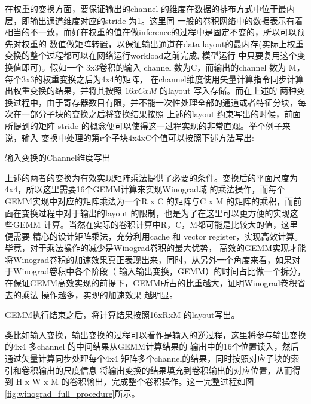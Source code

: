 在权重的变换方面，要保证输出的channel 的维度在数据的排布方式中位于最内层，即输出通道维度对应的stride 为1。这里同
一般的卷积网络中的数据表示有着相当的不一致，而好在权重的值在做inference的过程中是固定不变的，所以可以预先对权重的
数值做矩阵转置，以保证输出通道在data layout的最内存(实际上权重变换的整个过程都可以在网络运行workload之前完成, 模型运行
中只要复用这个变换值即可)。假如一个 3x3卷积的输入 channel 数为C，而输出的channel 数为 M，每个3x3的权重变换之后为4x4的矩阵，
在channel维度使用矢量计算指令同步计算出权重变换的结果，并将其按照 $ 16 x C x M $ 的layout 写入存储。而在上述的
两种变换过程中，由于寄存器数目有限，并不能一次性处理全部的通道或者特征分块，每次在一部分子块的变换之后将变换结果按照
上述的layout 约束写出的时候，前面所提到的矩阵 stride 的概念便可以使得这一过程实现的非常直观。举个例子来说，输入
变换中处理的第r个子块4x4xC个值可以按照下述方法写出:

\begin{algorithm}
  \caption{输入变换的Channel维度写出}
  \label{prog:store}
\end{algorithm}


上述的两者的变换为有效实现矩阵乘法提供了必要的条件。变换后的平面尺度为4x4，所以这里需要16个GEMM计算来实现Winograd域
的乘法操作，而每个GEMM实现中对应的矩阵乘法为一个R x C 的矩阵与C x M 的矩阵的乘积，而前面在变换过程中对于输出的layout
的限制，也是为了在这里可以更方便的实现这些GEMM 计算。当然在实际的卷积计算中R，C，M都可能是比较大的值，这里便需要
精心的设计矩阵乘法，充分利用cache 和 vector register，实现高效计算。毕竟，对于乘法操作的减少是Winograd卷积的最大优势，
高效的GEMM实现才能将Winograd卷积的加速效果真正表现出来，同时，从另外一个角度来看，如果对于Winograd卷积中各个阶段（
输入输出变换，GEMM）的时间占比做一个拆分，在保证GEMM高效实现的前提下，GEMM所占的比重越大，证明Winograd卷积省去的乘法
操作越多，实现的加速效果 越明显。

GEMM执行结束之后，将计算结果按照16xRxM 的layout写出。

类比如输入变换，输出变换的过程可以看作是输入的逆过程，这里将参与输出变换的4x4 多channel 的中间结果从GEMM计算结果的
输出中的16个位置读入，然后通过矢量计算同步处理每个4x4 矩阵多个channel的结果，同时按照对应子块的索引和卷积输出的尺度信息
将输出变换的结果填充到卷积输出的对应位置，从而得到 H x W x M 的卷积输出，完成整个卷积操作。这一完整过程如图\ref{fig:winograd_full_procedure}所示。

